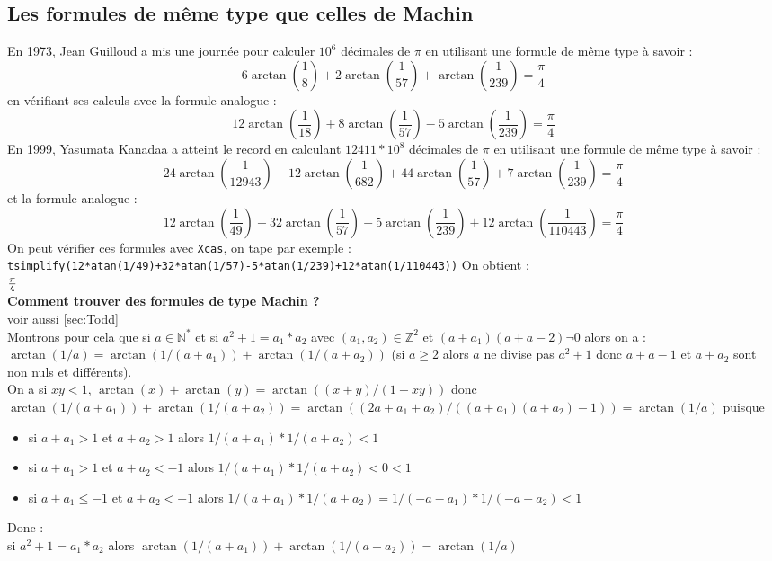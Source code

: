 \documentclass[a4paper,11pt]{book}
\newcommand{\Z}{{\mathbb{Z}}}
\newcommand{\N}{{\mathbb{N}}}
\begin{document}
\subsection{Les formules de m\^eme type que celles de Machin}
En 1973, Jean Guilloud a mis une journ\'ee pour calculer $10^6$ d\'ecimales de $\pi$ en utilisant une formule de m\^eme type \`a savoir :
$$6\arctan(\frac{1}{8})+2\arctan(\frac{1}{57})+\arctan(\frac{1}{239})=\frac{\pi}{4}$$
en v\'erifiant ses calculs avec la formule analogue :
$$12\arctan(\frac{1}{18})+8\arctan(\frac{1}{57})-5\arctan(\frac{1}{239})=\frac{\pi}{4}$$
En 1999, Yasumata Kanadaa a atteint le record en calculant $12411* 10^8$ d\'ecimales de $\pi$ en utilisant une formule de m\^eme type \`a savoir :
$$24\arctan(\frac{1}{12943})-12\arctan(\frac{1}{682}) +44\arctan(\frac{1}{57})+7\arctan(\frac{1}{239})=\frac{\pi}{4}$$
et la formule analogue :
$$12\arctan(\frac{1}{49})+32\arctan(\frac{1}{57})-5\arctan(\frac{1}{239})+12\arctan(\frac{1}{110443})=\frac{\pi}{4}$$
On peut v\'erifier ces formules avec {\tt Xcas}, on tape par exemple :\\
{\tt tsimplify(12*atan(1/49)+32*atan(1/57)-5*atan(1/239)+12*atan(1/110443))}
On obtient :\\
${\tt \frac{\pi}{4}}$\\
{\bf Comment trouver des formules de type Machin ?}\\
voir aussi \ref{sec:Todd}\\
Montrons pour cela que si $a \in \N^*$ et si $a^2+1=a_1*a_2$  avec 
$(a_1,a_2) \in \Z^2$ et $(a+a_1)(a+a-2)\neg 0$  alors on a :\\
$\arctan(1/a)=\arctan(1/(a+a_1))+\arctan(1/(a+a_2))$ (si $a\geq 2$ alors $a$ ne
divise pas $a^2+1$ donc $a+a-1$ et $a+a_2$ sont non nuls et diff\'erents).\\
On a si $xy<1$, $\arctan(x)+\arctan(y)=\arctan((x+y)/(1-xy))$ donc\\
$\arctan(1/(a+a_1))+\arctan(1/(a+a_2))=\arctan((2a+a_1+a_2)/((a+a_1)(a+a_2)-1))=\arctan(1/a)$ puisque 
\begin{itemize}
\item si $a+a_1>1$ et $a+a_2>1$ alors $1/(a+a_1)*1/(a+a_2)<1$ 
\item si $a+a_1>1$ et $a+a_2<-1$ alors $1/(a+a_1)*1/(a+a_2)<0<1$ 
\item si $a+a_1\leq -1$ et $a+a_2<-1$ alors $1/(a+a_1)*1/(a+a_2)=1/(-a-a_1)*1/(-a-a_2)<1$ 
\end{itemize}
Donc :\\
si $a^2+1=a_1*a_2$ alors  $\arctan(1/(a+a_1))+\arctan(1/(a+a_2))=\arctan(1/a)$\\
\end{document}
